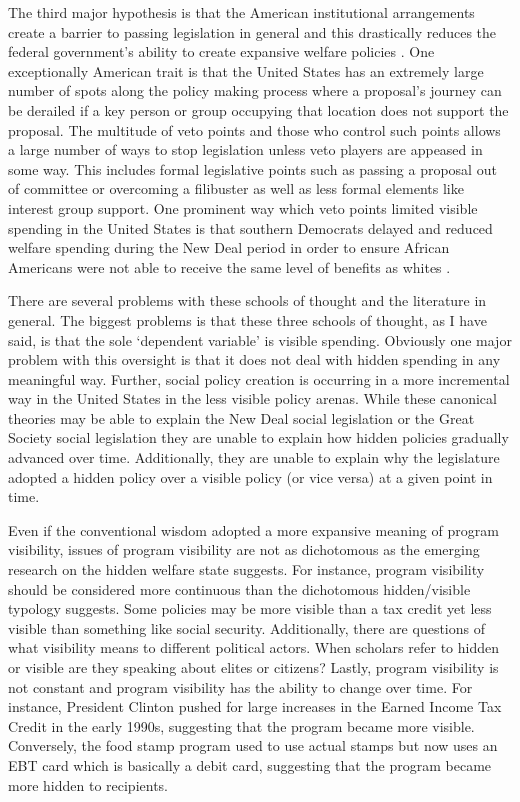 \documentclass[12pt]{article}
\begin{document}
The third major hypothesis is that the American institutional arrangements create a barrier to passing legislation in general and this drastically reduces the federal government's ability to create expansive welfare policies \citep{pierson1995, robertson2011}. One exceptionally American trait is that the United States has an extremely large number of spots along the policy making process where a proposal's journey can be derailed if a key person or group occupying that location does not support the proposal. The multitude of veto points and those who control such points allows a large number of ways to stop legislation unless veto players are appeased in some way. This includes formal legislative points such as passing a proposal out of committee or overcoming a filibuster as well as less formal elements like interest group support. One prominent way which veto points limited visible spending in the United States is that southern Democrats delayed and reduced welfare spending during the New Deal period in order to ensure African Americans were not able to receive the same level of benefits as whites \citep{katznelson2013}. 

There are several problems with these schools of thought and the literature in general. The biggest problems is that these three schools of thought, as I have said, is that the sole `dependent variable' is visible spending. Obviously one major problem with this oversight is that it does not deal with hidden spending in any meaningful way. Further, social policy creation is occurring in a more incremental way in the United States in the less visible policy arenas. While these canonical theories may be able to explain the New Deal social legislation or the Great Society social legislation they are unable to explain how hidden policies gradually advanced over time. Additionally, they are unable to explain why the legislature adopted a hidden policy over a visible policy (or vice versa) at a given point in time.

Even if the conventional wisdom adopted a more expansive meaning of program visibility, issues of program visibility are not as dichotomous as the emerging research on the hidden welfare state suggests. For instance, program visibility should be considered more continuous than the dichotomous hidden/visible typology suggests. Some policies may be more visible than a tax credit yet less visible than something like social security. Additionally, there are questions of what visibility means to different political actors. When scholars refer to hidden or visible are they speaking about elites or citizens? Lastly, program visibility is not constant and program visibility has the ability to change over time. For instance, President Clinton pushed for large increases in the Earned Income Tax Credit in the early 1990s, suggesting that the program became more visible. Conversely, the food stamp program used to use actual stamps but now uses an EBT card which is basically a debit card, suggesting that the program became more hidden to recipients.
\end{document}
